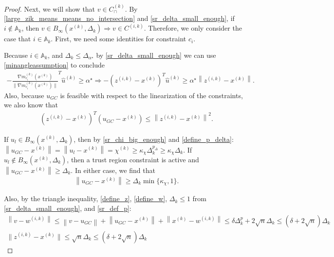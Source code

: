 \documentclass{article}
\theoremstyle{case}
\numberwithin{theorem}{subsection}
\newcommand{\activeconstraintsk}{{\mathbb A_{k}}}
\newcommand{\capcones}{{C^{(k)}_{\cap}}}
\newcommand{\chik}{{\chi^{(k)}}}
\newcommand{\dk}{\Delta_k}
\newcommand{\gmcik}{{\nabla m_{c_i}^{(k)}\left(\xk\right)}}
\newcommand{\huk}{{{\hat u}^{(k)}}}
\newcommand{\minanglealpha}{{ \alpha^{\star} }}
\newcommand{\minangledelta}{{\Delta_{\alpha^{\star}}}}
\newcommand{\tr}{{ B_{\infty}\left(\xk, \dk\right) }}
\newcommand{\wik}{{w^{(i, k)}}}
\newcommand{\xk}{x^{(k)}}
\newcommand{\zik}{{z^{(i, k)}}}
\newcommand{\fik}{{C^{(i, k)}}}
\begin{document}
\begin{proof}
Next, we will show that $v \in \capcones$.
\color{red}
By \cref{large_zik_means_means_no_intersection} and \cref{sr_delta_small_enough}, if $i \not \in \activeconstraintsk$, then $v \in \tr \Longrightarrow v \in \fik$.
Therefore, we only consider the case that $i \in \activeconstraintsk$.
\color{black}
First, we need some identities for constraint $c_i$.

Because $i \in \activeconstraintsk$, and $\dk\le\minangledelta$ by \cref{sr_delta_small_enough} we can use \cref{minangleassumption} to conclude
\begin{align}
-\frac {\gmcik}{\|\gmcik\|} ^T\huk \ge \minanglealpha \Longrightarrow -\left(\zik - \xk\right)^T\huk \ge \minanglealpha \left\|\zik - \xk\right\|. \label{u_is_feasible}
\end{align}
Also, because $u_{GC}$ is feasible with respect to the linearization of the constraints, we also know that
\begin{align}
\left(\zik - \xk\right)^T(u_{GC} - \xk) \le \left\|\zik - \xk\right\|^2. \label{gc_is_feasible}
\end{align}

If $u_l \in \tr$, then by \cref{sr_chi_big_enough} and \cref{define_p_delta}: $\left\|u_{GC} - \xk\right\|  = \left\|u_{l} - \xk\right\| = \chik \ge \kappa_{\chi} \dk^{p_{\Delta}} \ge  \kappa_{\chi} \dk$.
If $u_l \not \in \tr$, then a trust region constraint is active and $\left\|u_{GC} - \xk\right\| \ge \dk$.
In either case, we find that 
\begin{align}
\left\|u_{GC} - \xk\right\| \ge \dk \min\{\kappa_{\chi}, 1 \} \label{gc_big_enough}.
\end{align}


Also, by the triangle inequality, \cref{define_z}, \cref{define_w}, $\dk \le 1$ from \cref{sr_delta_small_enough}, and \cref{sr_def_p}:
\begin{align}
\left\|v - \wik\right\| \le \left\|v - u_{GC}\right\| + \left\|u_{GC} - \xk \right\| + \left\|\xk - \wik\right\| \le \delta \dk^p + 2\sqrt{n}\dk \le \left(\delta + 2\sqrt{n}\right)\dk \label{sr_v_minus_w_small} \\
\|\zik - \xk \| \le \sqrt{n}\dk \le \left(\delta + 2\sqrt{n}\right)\dk \label{sr_z_minus_x_small}
\end{align}


\end{proof}
\end{document}
